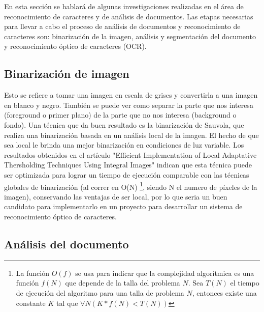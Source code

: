 \documentclass[a4paper, 11pt, oneside]{report}
\begin{document}
En esta sección se hablará de algunas investigaciones realizadas en el área de reconocimiento de caracteres y de análisis de documentos. Las etapas necesarias para llevar a cabo el proceso de análisis de documentos y reconocimiento de caracteres son: binarización de la imagen, análisis y segmentación del documento y reconocimiento óptico de caracteres (OCR).  

\subsection{Binarización de imagen}

Esto se refiere a tomar una imagen en escala de grises y convertirla a una  imagen en blanco y negro. También se puede ver como separar la parte que nos interesa (foreground o primer plano) de la parte que no nos interesa (background o fondo). Una técnica que da buen resultado es la binarización de Sauvola, que realiza una binarización basada en un análisis local de la imagen. El hecho de que sea local le brinda una mejor binarización en condiciones de luz variable. Los  resultados obtenidos en el artículo "Efficient Implementation of Local Adaptative  Thersholding Techniques Using Integral Images" indican que esta técnica puede ser optimizada para lograr un tiempo de ejecución comparable con las técnicas globales de  binarización (al correr en O(N) \footnote{La función $O(f)$ se usa para indicar que la complejidad algorítmica es una función $f(N)$ que depende de la talla del problema $N$. Sea $T(N)$ el tiempo de  ejecución del algoritmo para una talla de problema $N$, entonces existe una constante $K$ tal que  $\forall N ( K*f(N) < T(N) ) $}, siendo N el numero de píxeles de la imagen), conservando las ventajas de ser local, por lo que seria un buen candidato para implementarlo en un proyecto para desarrollar un sistema de reconocimiento óptico de caracteres.

\subsection{Análisis del documento}
\end{document}
